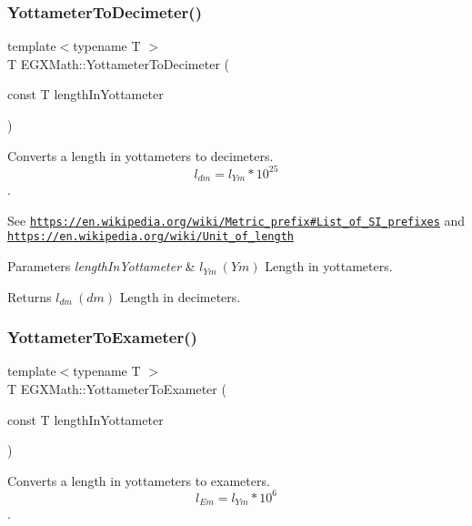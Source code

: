 \subsubsection{\texorpdfstring{Yottameter\+To\+Decimeter()}{YottameterToDecimeter()}}
{\footnotesize\ttfamily template$<$typename T $>$ \\
T E\+G\+X\+Math\+::\+Yottameter\+To\+Decimeter (\begin{DoxyParamCaption}\item[{const T}]{length\+In\+Yottameter }\end{DoxyParamCaption})}



Converts a length in yottameters to decimeters. \[ l_{dm}=l_{Ym} * 10^{25} \]. 

See \href{https://en.wikipedia.org/wiki/Metric_prefix#List_of_SI_prefixes}{\tt https\+://en.\+wikipedia.\+org/wiki/\+Metric\+\_\+prefix\#\+List\+\_\+of\+\_\+\+S\+I\+\_\+prefixes} and \href{https://en.wikipedia.org/wiki/Unit_of_length}{\tt https\+://en.\+wikipedia.\+org/wiki/\+Unit\+\_\+of\+\_\+length} 
\begin{DoxyParams}{Parameters}
{\em length\+In\+Yottameter} & $ l_{Ym}\ (Ym)$ Length in yottameters. \\
\hline
\end{DoxyParams}
\begin{DoxyReturn}{Returns}
$ l_{dm}\ (dm)$ Length in decimeters. 
\end{DoxyReturn}
\mbox{\label{group___e_g_x_math-_conversions-_length_conversions-_yottameter-_s_i_ga596bb0befe41a04cc5e193786ccc8de7}} 
\subsubsection{\texorpdfstring{Yottameter\+To\+Exameter()}{YottameterToExameter()}}
{\footnotesize\ttfamily template$<$typename T $>$ \\
T E\+G\+X\+Math\+::\+Yottameter\+To\+Exameter (\begin{DoxyParamCaption}\item[{const T}]{length\+In\+Yottameter }\end{DoxyParamCaption})}



Converts a length in yottameters to exameters. \[ l_{Em}=l_{Ym} * 10^{6} \]. 

